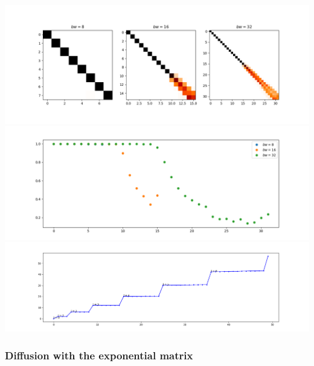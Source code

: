 \begin{minipage}[t!]{.49\textwidth}
	\center
	\includegraphics[width=\linewidth]{../codes/03.FEM_laplacian/equiangular/normal/img/linearFEM.png}
	\includegraphics[width=\linewidth]{../codes/03.FEM_laplacian/equiangular/normal/img/linearFEM_diagonal.png}	
	\includegraphics[width=\linewidth]{../codes/03.FEM_laplacian/equiangular/normal/img/FEM_eigenvalues_16.png}	
\end{minipage}

\subsubsection{Diffusion with the exponential matrix}

